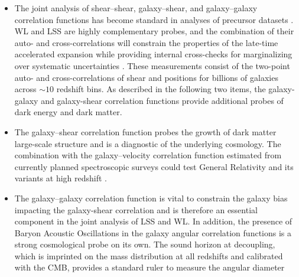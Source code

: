 \begin{itemize}
\item The
joint analysis of shear--shear, galaxy--shear, and galaxy--galaxy
correlation functions has become standard in analyses of precursor datasets
\cite[e.g.][]{2017arXiv170801530D,2018MNRAS.474.4894J}. WL and LSS are highly complementary probes, and the combination
of their auto- and cross-correlations will constrain the properties of the late-time accelerated expansion while providing
internal cross-checks for marginalizing over systematic uncertainties \cite[e.g.,][]{2017arXiv171003235M}.
These measurements consist of the two-point auto- and cross-correlations of shear and positions for billions of galaxies across $\sim 10$ redshift bins.
As described in the following two items, the galaxy-galaxy and galaxy-shear correlation functions provide additional probes of dark energy and dark matter.
%
%
\item The galaxy--shear correlation function probes the growth of dark matter large-scale structure and is a
diagnostic of the underlying cosmology. The combination with the
galaxy--velocity correlation function estimated from currently planned
spectroscopic surveys
could test General Relativity and its variants at high redshift \citep{2010Natur.464..256R}.
%
\item The galaxy--galaxy correlation function is vital to constrain the galaxy bias impacting the galaxy-shear correlation and is therefore
an essential component in the joint analysis of LSS and WL. In addition, the presence of
Baryon Acoustic Oscillations in the galaxy angular correlation functions is a strong cosmological
probe on its own. The sound horizon at decoupling, which is imprinted on the
mass distribution at all redshifts and calibrated with the CMB, provides a standard ruler to measure the angular diameter

\end{itemize}
